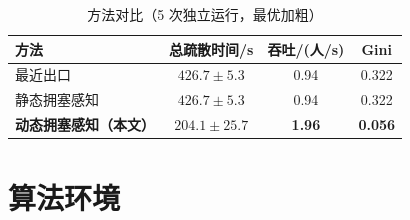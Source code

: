 \documentclass[withoutpreface,bwprint]{cumcmthesis}
\begin{document}
\begin{table}[H]
  \centering
  \caption{方法对比（5 次独立运行，最优加粗）}
  \label{tab:smoke}
  \begin{tabular}{lccc}
    \toprule
    方法 & 总疏散时间/s & 吞吐/(人/s) & Gini \\
    \midrule
    最近出口 & $426.7\pm5.3$ & 0.94 & 0.322 \\
    静态拥塞感知 & $426.7\pm5.3$ & 0.94 & 0.322 \\
    \textbf{动态拥塞感知（本文）} & $\mathbf{204.1\pm25.7}$ & \textbf{1.96} & \textbf{0.056} \\
    \bottomrule
  \end{tabular}
\end{table}

\section{算法环境}

\begin{algorithm}[H]
  \caption{拥塞感知动态重分配}
  \label{alg:smoke}
\end{algorithm}
\end{document}
